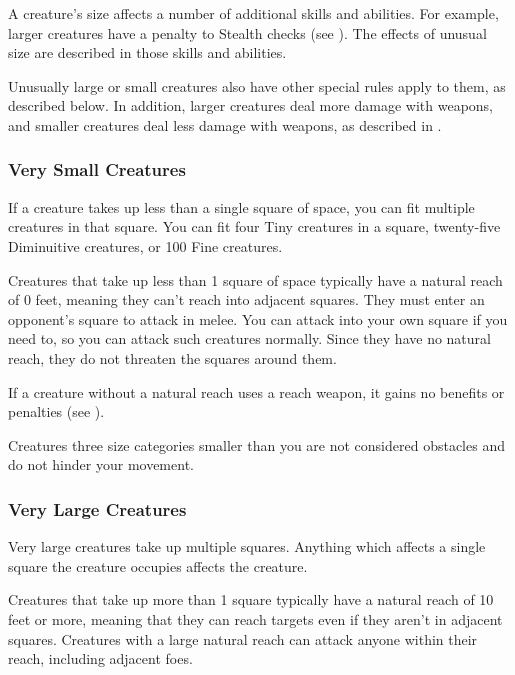         A creature's size affects a number of additional skills and abilities.
        For example, larger creatures have a penalty to Stealth checks (see ).
        The effects of unusual size are described in those skills and abilities.

        Unusually large or small creatures also have other special rules apply to them, as described below.
        In addition, larger creatures deal more damage with weapons, and smaller creatures deal less damage with weapons, as described in .

        \subsubsection{Very Small Creatures}
             If a creature takes up less than a single square of space, you can fit multiple creatures in that square. You can fit four Tiny creatures in a square, twenty-five Diminuitive creatures, or 100 Fine creatures.

             Creatures that take up less than 1 square of space typically have a natural reach of 0 feet, meaning they can't reach into adjacent squares. They must enter an opponent's square to attack in melee. You can attack into your own square if you need to, so you can attack such creatures normally. Since they have no natural reach, they do not threaten the squares around them.

            If a creature without a natural reach uses a reach weapon, it gains no benefits or penalties (see ).

             Creatures three size categories smaller than you are not considered obstacles and do not hinder your movement.

        \subsubsection{Very Large Creatures}
             Very large creatures take up multiple squares. Anything which affects a single square the creature occupies affects the creature.

             Creatures that take up more than 1 square typically have a natural reach of 10 feet or more, meaning that they can reach targets even if they aren't in adjacent squares. Creatures with a large natural reach can attack anyone within their reach, including adjacent foes.

